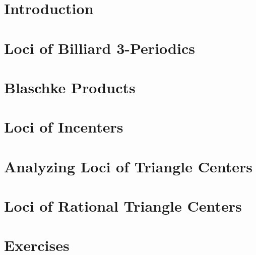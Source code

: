 \section{Introduction}


\section{Loci of Billiard 3-Periodics}


\section{Blaschke Products}
\label{sec:04-blaschke}


\section{Loci of Incenters}
\label{sec:04-proof_theorem}


\section{Analyzing Loci of Triangle Centers}
\label{sec:04-loci}


\section{Loci of Rational Triangle Centers}
\label{sec:04-rational-trilinears}


\section{Exercises}
\label{sec:04-exercises}
